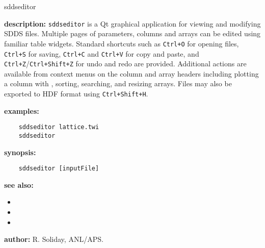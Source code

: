 \begin{sddsprog}{sddseditor}
  \item \textbf{description:} \verb|sddseditor| is a Qt graphical application for viewing
  and modifying SDDS files. Multiple pages of parameters, columns and arrays can be
  edited using familiar table widgets. Standard shortcuts such as
  \verb|Ctrl+O| for opening files, \verb|Ctrl+S| for saving, \verb|Ctrl+C| and
  \verb|Ctrl+V| for copy and paste, and \verb|Ctrl+Z|/\verb|Ctrl+Shift+Z| for
  undo and redo are provided. Additional actions are available from context menus
  on the column and array headers including plotting a column with
  , sorting, searching, and resizing arrays. Files may also be
  exported to HDF format using \verb|Ctrl+Shift+H|.

  \item \textbf{examples:}
    \begin{verbatim}
    sddseditor lattice.twi
    sddseditor
    \end{verbatim}

  \item \textbf{synopsis:}
    \begin{verbatim}
    sddseditor [inputFile]
    \end{verbatim}

  \item \textbf{see also:}
    \begin{itemize}
      \item {}
      \item {}
      \item {}
    \end{itemize}
  \item \textbf{author:} R. Soliday, ANL/APS.
\end{sddsprog}

